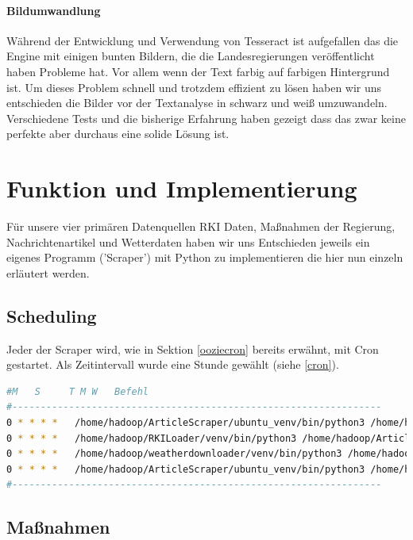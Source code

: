 \documentclass[12pt,oneside,a4paper,parskip]{scrbook}
\begin{document}
\subsubsection{Bildumwandlung}\label{sec:sub:sub:bild}
Während der Entwicklung und Verwendung von Tesseract ist aufgefallen das die Engine mit einigen bunten Bildern, die die Landesregierungen veröffentlicht haben Probleme hat. Vor allem wenn der Text farbig auf farbigen Hintergrund ist. Um dieses Problem schnell und trotzdem effizient zu lösen haben wir uns entschieden die Bilder vor der Textanalyse in schwarz und weiß umzuwandeln. Verschiedene Tests und die bisherige Erfahrung haben gezeigt dass das zwar keine perfekte aber durchaus eine solide Lösung ist.

\chapter{Funktion und Implementierung}

Für unsere vier primären Datenquellen RKI Daten, Maßnahmen der Regierung, Nachrichtenartikel und Wetterdaten haben wir uns Entschieden jeweils ein eigenes Programm ('Scraper') mit Python zu implementieren die hier nun einzeln erläutert werden. \newline

\section{Scheduling}
Jeder der Scraper wird, wie in Sektion \ref{ooziecron} bereits erwähnt, mit Cron gestartet. Als Zeitintervall wurde eine Stunde gewählt (siehe \ref{cron}). \newline

\begin{lstlisting}[caption=Cron-einstellungen,label=cron,language=bash]
#M   S     T M W   Befehl
#-----------------------------------------------------------------
0 * * * *   /home/hadoop/ArticleScraper/ubuntu_venv/bin/python3 /home/hadoop/ArticleScraper/main.py
0 * * * *   /home/hadoop/RKILoader/venv/bin/python3 /home/hadoop/ArticleScraper/main.py
0 * * * *   /home/hadoop/weatherdownloader/venv/bin/python3 /home/hadoop/ArticleScraper/main.py
0 * * * *   /home/hadoop/ArticleScraper/ubuntu_venv/bin/python3 /home/hadoop/ArticleScraper/main.py
#-----------------------------------------------------------------
\end{lstlisting}

\pagebreak

\section{Maßnahmen}
\end{document}
